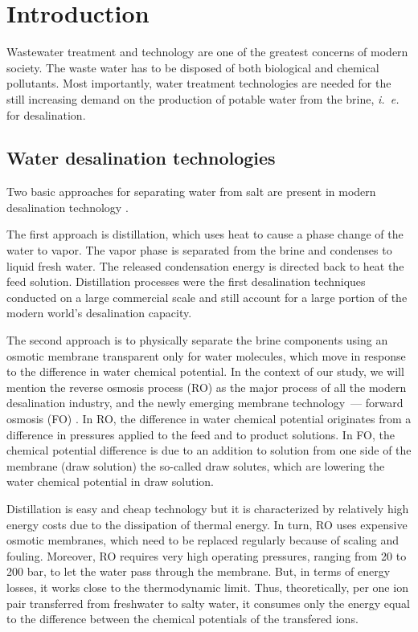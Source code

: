 \documentclass[journal,article,submit,pdftex,moreauthors]{Definitions/mdpi}
\newcommand{\ie}{\textit{i.~e.} }
\begin{document}




\section{Introduction\label{sec: intro}}
Wastewater treatment and technology are one of the greatest concerns of modern society.
The waste water has to be disposed of both biological \cite{guesmi2022} and chemical \cite{baaloudj2022_1,shahzad2022} pollutants.
Most importantly, water treatment technologies are needed for the still increasing demand on the production of potable water from the brine, \ie for desalination.

\subsection{Water desalination technologies}
Two basic approaches for separating water from salt are present in modern desalination technology \cite{Miller2003,Curto2021}.

The first approach is distillation, which uses heat to cause a phase change of the water to vapor. 
The vapor phase is separated from the brine and condenses to liquid fresh water. 
The released condensation energy is directed back to heat the feed solution.
Distillation processes were the first desalination techniques conducted on a large commercial scale and still account for a large portion of the modern world’s desalination capacity.

The second approach is to physically separate the brine components using an osmotic membrane transparent only for water molecules, which move in response to the difference in water chemical potential.
In the context of our study, we will mention the reverse osmosis process (RO) as the major process of all the modern desalination industry, and the newly emerging membrane technology~--- forward osmosis (FO) \cite{Akther2015}. 
In RO, the difference in water chemical potential originates from a difference in pressures applied to the feed and to product solutions. 
In FO, the chemical potential difference is due to an addition to solution from one side of the membrane (draw solution) the so-called draw solutes, which are lowering the water chemical potential in draw solution.

Distillation is easy and cheap technology but it is characterized by relatively high energy costs due to the dissipation of thermal energy. 
In turn, RO uses expensive osmotic membranes, which need to be replaced regularly because of scaling and fouling. 
Moreover, RO requires very high operating pressures, ranging from 20 to 200 bar, to let the water pass through the membrane. 
But, in terms of energy losses, it works close to the thermodynamic limit.
Thus, theoretically, per one ion pair transferred from freshwater to salty water, it consumes only the energy equal to the difference between the chemical potentials of the transfered ions.
\end{document}
